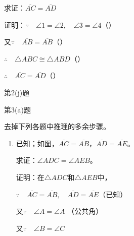 \begin{Exercise}
\begin{question}
\begin{enumerate}
求证：$\overline{AC}=\overline{AD}$

证明：$\because\quad \angle 1=\angle 2,\quad \angle 3=\angle 4$（\qquad ）

又$\because\quad \overline{AB}=\overline{AB}$（\qquad ）

$\therefore\quad\triangle ABC\cong \triangle ABD$（\qquad ）

$\therefore\quad \overline{AC}=\overline{AD}$（\qquad ）

\begin{figurehere}
    \begin{minipage}[b]{0.48\linewidth}
    \centering
\begin{tikzpicture}[>=latex, scale=1]
    \end{tikzpicture}
    \caption*{第2(j)题}
    \end{minipage}
    \begin{minipage}[b]{0.48\linewidth}
    \centering
    \caption*{第3(a)题}
    \end{minipage}
    \end{figurehere}
\end{enumerate}

\item 去掉下列各题中推理的多余步骤。
\begin{enumerate}
	\item 已知；如图，$\overline{AC}=\overline{AB}$，$\overline{AD}=\overline{AE}$。
	
求证：$\angle ADC=\angle AEB$。

证明：在$\triangle ADC$和$\triangle AEB$中，

$\because\quad \overline{AC}=\overline{AB},\quad \overline{AD}=\overline{AE}$（已知）

又$\because\quad \angle A=\angle A$ （公共角）

又$\because\quad \angle B=\angle C$ 


\end{enumerate}
\end{question}
\end{Exercise}
